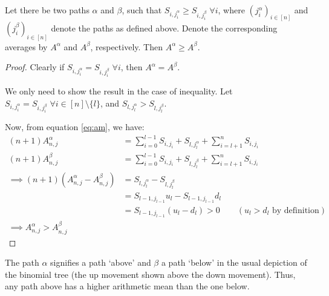\begin{thm}
	\label{thm:sp-asian-up-dn-path}
	Let there be two paths $\alpha$ and $\beta$, such that $S_{i,j_i^\alpha} \ge S_{i,j_i^\beta} \; \forall i$, where $ ( j_i^\alpha )_{i \in [n]} $ and $ ( j_i^\beta )_{i \in [n]} $ denote the paths as defined above. Denote the corresponding averages by $A^\alpha$ and $A^\beta$, respectively. Then $ A^\alpha \ge A^\beta $.
\end{thm}

\begin{proof}
	Clearly if $S_{i,j_i^\alpha} = S_{i,j_i^\beta} \; \forall i$, then $A^\alpha = A^\beta$.
	
	We only need to show the result in the case of inequality.
	Let $ S_{i,j_i^\alpha} = S_{i,j_i^\beta} \; \forall i \in [n] \setminus \{l\} $, and $ S_{l,j_l^\alpha} > S_{l,j_l^\beta}$.
	
	Now, from equation \ref{eq:am}, we have:
	\begin{align*}
		(n+1) A_{n,j}^\alpha &= \sum_{i=0}^{l-1} S_{i,j_i} + S_{l,j_l^\alpha} + \sum_{i=l+1}^{n} S_{i,j_i} \\
		(n+1) A_{n,j}^\beta &= \sum_{i=0}^{l-1} S_{i,j_i} + S_{l,j_l^\beta} + \sum_{i=l+1}^{n} S_{i,j_i} \\
		\implies (n+1) \left(A_{n,j}^\alpha - A_{n,j}^\beta\right) &= S_{l,j_l^\alpha} - S_{l,j_l^\beta} \\
												 &= S_{l-1,j_{l-1}} u_l - S_{l-1,j_{l-1}} d_l \\
												 &= S_{l-1,j_{l-1}} (u_l - d_l) > 0 \qquad (u_l > d_l \text{ by definition}) \\
		\implies A_{n,j}^\alpha > A_{n,j}^\beta
	\end{align*}
\end{proof}


\begin{rem}
	The path $\alpha$ signifies a path `above' and $\beta$ a path `below' in the usual depiction of the binomial tree (the up movement shown above the down movement). Thus, any path above	 has a higher arithmetic mean than the one below.
\end{rem}


